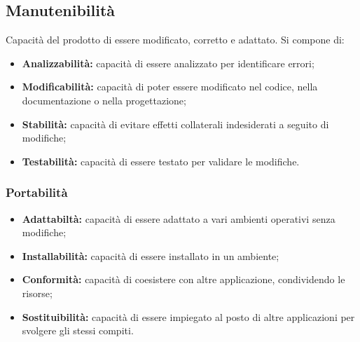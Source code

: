 \subsection{Manutenibilità}
Capacità del prodotto di essere modificato, corretto e adattato. Si compone di:
\begin{itemize}
    \item \textbf{Analizzabilità: }capacità di essere analizzato per identificare errori;
    \item \textbf{Modificabilità: }capacità di poter essere modificato nel codice, nella documentazione o nella progettazione;
    \item \textbf{Stabilità: }capacità di evitare effetti collaterali indesiderati a seguito di modifiche;
    \item \textbf{Testabilità: }capacità di essere testato per validare le modifiche.
\end{itemize}
\subsubsection{Portabilità}
\begin{itemize}
    \item \textbf{Adattabiltà: }capacità di essere adattato a vari ambienti operativi senza modifiche;
    \item \textbf{Installabilità: }capacità di essere installato in un ambiente;
    \item \textbf{Conformità: }capacità di coesistere con altre applicazione, condividendo le risorse;
    \item \textbf{Sostituibilità: }capacità di essere impiegato al posto di altre applicazioni per svolgere gli stessi compiti.
\end{itemize}